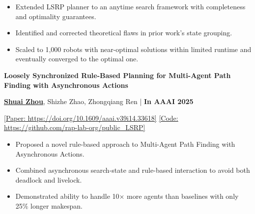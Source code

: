 \documentclass[a4paper,9pt]{extarticle}
\begin{document}
\begin{itemize} 
    \item Extended LSRP planner to an anytime search framework with completeness and optimality guarantees.
    \item Identified and corrected theoretical flaws in prior work's state grouping.
    \item Scaled to 1,000 robots with near-optimal solutions within limited runtime and eventually converged to the optimal one. 
\end{itemize} 
\par\textbf{Loosely Synchronized Rule-Based Planning for
Multi-Agent Path Finding with Asynchronous Actions}
\par\textup{\underline{\textbf{Shuai Zhou}}, Shizhe Zhao, Zhongqiang Ren   \hfill | \textbf{In AAAI 2025}}  %
\par\textup{\textbar{} \href{https://doi.org/10.1609/aaai.v39i14.33618}{[Paper: https://doi.org/10.1609/aaai.v39i14.33618]}  \textbar{} \href{https://github.com/rap-lab-org/public_LSRP}{[Code: https://github.com/rap-lab-org/public\_LSRP]}  \textbar{}}
\begin{itemize}
    \item  Proposed a novel rule-based approach to Multi-Agent Path Finding with Asynchronous Actions.
    \item Combined asynchronous search-state and rule-based interaction to avoid both deadlock and livelock.
    \item Demonstrated ability to handle 10× more agents than baselines with only 25\% longer makespan.
\end{itemize}
\end{document}
